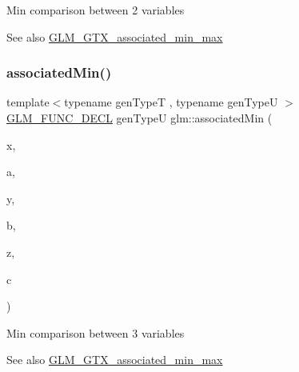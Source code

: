 Min comparison between 2 variables \begin{DoxySeeAlso}{See also}
\hyperlink{group__gtx__associated__min__max}{G\+L\+M\+\_\+\+G\+T\+X\+\_\+associated\+\_\+min\+\_\+max} 
\end{DoxySeeAlso}
\mbox{\label{group__gtx__associated__min__max_ga3f696c0cce55211f333edb7336cc9cb8}} 
\subsubsection{\texorpdfstring{associated\+Min()}{associatedMin()}\hspace{0.1cm}{\footnotesize\ttfamily [2/3]}}
{\footnotesize\ttfamily template$<$typename gen\+TypeT , typename gen\+TypeU $>$ \\
\hyperlink{setup_8hpp_ab2d052de21a70539923e9bcbf6e83a51}{G\+L\+M\+\_\+\+F\+U\+N\+C\+\_\+\+D\+E\+CL} gen\+TypeU glm\+::associated\+Min (\begin{DoxyParamCaption}\item[{const gen\+TypeT \&}]{x,  }\item[{const gen\+TypeU \&}]{a,  }\item[{const gen\+TypeT \&}]{y,  }\item[{const gen\+TypeU \&}]{b,  }\item[{const gen\+TypeT \&}]{z,  }\item[{const gen\+TypeU \&}]{c }\end{DoxyParamCaption})}

Min comparison between 3 variables \begin{DoxySeeAlso}{See also}
\hyperlink{group__gtx__associated__min__max}{G\+L\+M\+\_\+\+G\+T\+X\+\_\+associated\+\_\+min\+\_\+max} 
\end{DoxySeeAlso}
\mbox{\label{group__gtx__associated__min__max_ga45618e13844d00046a0fe3409ae7513e}} 
